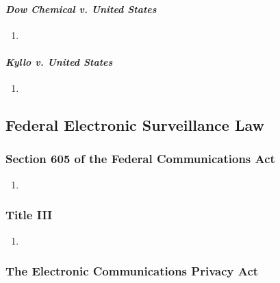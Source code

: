 \paragraph{\emph{Dow Chemical v. United States}} %



\begin{enumerate}
    \item 
\end{enumerate}

\paragraph{\emph{Kyllo v. United States}} %


\begin{enumerate}
    \item 
\end{enumerate}


\subsection{Federal Electronic Surveillance Law}

\subsubsection{Section 605 of the Federal Communications Act}

\begin{enumerate}
    \item %
\end{enumerate}

\subsubsection{Title III}

\begin{enumerate}
    \item %
\end{enumerate}

\subsubsection{The Electronic Communications Privacy Act}

